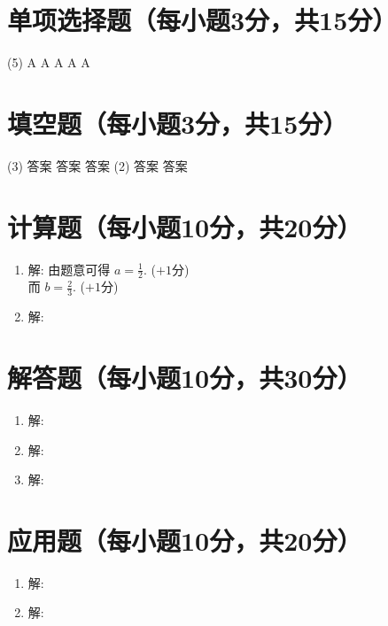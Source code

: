 \documentclass[answer,AutoFakeBold=2.85]{cjluexam}
\begin{document}
\maketitle

\section{单项选择题（每小题3分，共15分）}

\begin{tasks}(5)
  \task A
  \task A
  \task A
  \task A
  \task A
\end{tasks}

\section{填空题（每小题3分，共15分）}

\begin{tasks}(3)
  \task 答案
  \task 答案
  \task 答案
  \task*(2) 答案
  \task 答案
\end{tasks}

\section{计算题（每小题10分，共20分）}

\begin{enumerate}
  \item 解:
    由题意可得 $\displaystyle a=\frac12$.
    \dotfill ($+1$分)\\
    而 $\displaystyle b=\frac23$.
    \dotfill ($+1$分)
  \item 解:
\end{enumerate}

\section{解答题（每小题10分，共30分）}

\begin{enumerate}
  \item 解:
  \item 解:
  \item 解:
\end{enumerate}

\section{应用题（每小题10分，共20分）}

\begin{enumerate}
  \item 解:
  \item 解:
\end{enumerate}
\end{document}
